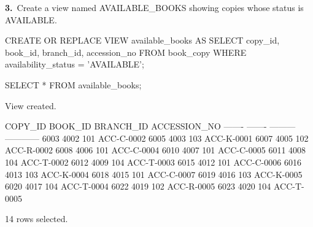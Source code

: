 \noindent\begin{minipage}{\linewidth}
\begingroup{}
{\fontsize{14}{17}\selectfont\textbf{3.}}\ Create a view named AVAILABLE\_BOOKS showing copies whose status is AVAILABLE.\par
\endgroup\vspace{12pt}


\begin{sqlcode}
CREATE OR REPLACE VIEW available_books AS
SELECT copy_id, book_id, branch_id, accession_no
FROM book_copy
WHERE availability_status = 'AVAILABLE';

SELECT * FROM available_books;
\end{sqlcode}

\vspace{18pt}


\begin{sqlout}[fontsize=\small]
View created.

COPY_ID  BOOK_ID  BRANCH_ID  ACCESSION_NO
-------  -------  ---------  ------------
   6003     4002        101  ACC-C-0002
   6005     4003        103  ACC-K-0001
   6007     4005        102  ACC-R-0002
   6008     4006        101  ACC-C-0004
   6010     4007        101  ACC-C-0005
   6011     4008        104  ACC-T-0002
   6012     4009        104  ACC-T-0003
   6015     4012        101  ACC-C-0006
   6016     4013        103  ACC-K-0004
   6018     4015        101  ACC-C-0007
   6019     4016        103  ACC-K-0005
   6020     4017        104  ACC-T-0004
   6022     4019        102  ACC-R-0005
   6023     4020        104  ACC-T-0005

14 rows selected.
\end{sqlout}
\end{minipage}\par\vspace{24pt}

